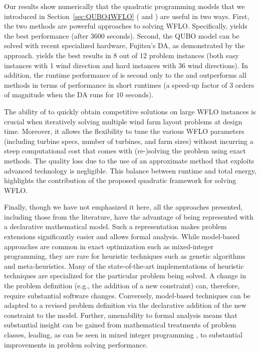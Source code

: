 \documentclass[preprint,12pt]{elsarticle}
\newcommand{\qcls}{{\sf {\small QC-LS\xspace}}}
\newcommand{\quls}{{\sf {\small QU-LS\xspace}}}
\newcommand{\qclsgrb}{{\sf {\small QC-LS(GRB)\xspace}}}
\newcommand{\qulsda}{{\sf {\small QU-LS(DA)\xspace}}}
\begin{document}
Our results show numerically that the quadratic programming models that we
introduced in Section~\ref{sec:QUBO4WFLO} (\qcls{} and \quls{}) are useful in two ways.
First, the two methods are powerful approaches to solving WFLO. Specifically, \qcls{} yields the best performance (after 3600 seconds). Second, the QUBO model can be solved with recent specialized hardware, Fujitsu's DA, as demonstrated by the \qulsda{} approach. \qulsda{} yields the best results in 8 out of 12 problem instances (both easy instances with 1 wind direction and hard instances with 36 wind directions). 
In addition, the runtime performance of \qulsda{} is second
only to the \qclsgrb{} and outperforms all methods in terms of performance in short runtimes (a speed-up factor of 3 orders of magnitude when the DA runs for $10$ seconds).



The ability of \qulsda{} to quickly obtain competitive solutions on large WFLO instances 
is crucial when iteratively solving
multiple wind farm layout problems at design time. Moreover, it allows the flexibility to tune the various WFLO parameters (including turbine specs, number of turbines, and farm sizes) without incurring a steep computational cost that comes
with (re-)solving the problem using exact methods. The quality loss due to the use of an approximate method 
that exploits advanced technology is negligible. This balance between
runtime and total energy, highlights the contribution of the proposed quadratic framework for solving WFLO. 

Finally, though we have not emphasized it here, all the approaches presented, including those from the literature, have the advantage of being represented with a declarative mathematical model. Such a representation makes problem extensions significantly easier and allows formal analysis. While model-based  approaches are common in exact optimization such as mixed-integer programming, they are rare for heuristic techniques such as genetic algorithms and meta-heuristics. Many of the state-of-the-art implementations of heuristic techniques are specialized for the particular problem being solved. A change in the problem definition (e.g., the addition of a new constraint) can, therefore, require substantial software changes. Conversely, model-based techniques can be adapted to a revised problem definition via the declarative addition of the new constraint to the model. Further, amenability to formal analysis means that substantial insight can be gained from mathematical treatments of problem classes, leading, as can be seen in mixed integer programming \cite{Bixby07a}, to substantial improvements in problem solving performance.
\end{document}
